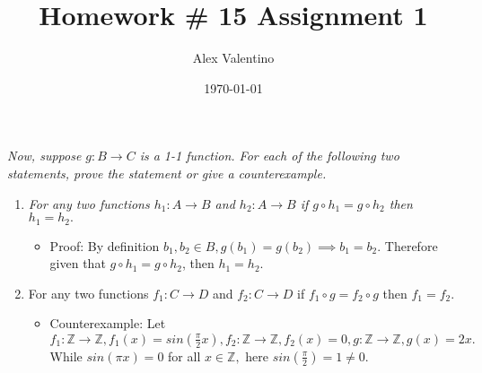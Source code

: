 \documentclass[12pt, letterpaper]{article}
\date{\today}
\title{Homework \# 15 }
\author{Alex Valentino}
\title{Assignment 1}
\newcommand{\Z}{\mathbb{Z}}
\begin{document}
	

\textit{Now, suppose $g: B \to C$ is a 1-1 function. For each of the following two statements, prove
the statement or give a counterexample.}\\
\begin{enumerate}
	\item \textit{For any two functions $h_1 : A \to B$ and $h_2 : A \to B$ if $g \circ h_1 = g \circ h_2$ then $h_1 = h_2.$}
		\begin{itemize}
			\item Proof: By definition $b_1, b_2 \in B, g(b_1) = g(b_2) \implies b_1 = b_2$.  Therefore given that $g \circ h_1 = g \circ h_2$, then $h_1 = h_2.$
		\end{itemize}
	\item For any two functions $f_1 : C \to D$ and $f_2 : C \to D$ if $f_1 \circ g = f_2 \circ g$ then $f_1 = f_2.$ 
		\begin{itemize}
			\item Counterexample: Let $f_1 : \Z \to \Z, f_1(x) = sin(\frac{\pi}{2}x), f_2 : \Z \to \Z, f_2(x) = 0, g: \Z \to \Z, g(x) = 2x.$  While $sin(\pi x) = 0$ for all $x\in \Z,$ here $sin(\frac{\pi}{2}) = 1 \neq 0.$
		\end{itemize}
\end{enumerate}
\end{document}
